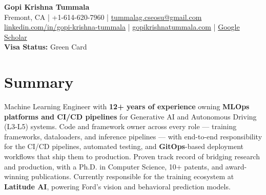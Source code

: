 \documentclass[10pt,letterpaper]{article}
\begin{document}
\begin{center}
    {\Huge \textbf{Gopi Krishna Tummala}} \\ [6pt]
    \large
    \faMapMarker* Fremont, CA \quad | \quad
    \faPhone* +1-614-620-7960 \quad | \quad
    \faEnvelope* \href{mailto:tummalag.cseosu@gmail.com}{tummalag.cseosu@gmail.com} \\ [4pt]
    \small
    \faLinkedin \href{https://www.linkedin.com/in/gopi-krishna-tummala-00294415/}{ linkedin.com/in/gopi-krishna-tummala} \quad | \quad
    \faGlobe \href{https://gopikrishnatummala.com/}{ gopikrishnatummala.com} \quad | \quad
    \faGraduationCap \href{https://scholar.google.com/citations?user=SaKqqO8AAAAJ&hl=en}{ Google Scholar} \\ [4pt]
    \textbf{Visa Status:} Green Card
\end{center}

\section{Summary}
Machine Learning Engineer with \textbf{12+ years of experience} owning \textbf{MLOps platforms and CI/CD pipelines} for Generative AI and Autonomous Driving (L3-L5) systems. Code and framework owner across every role — training frameworks, dataloaders, and inference pipelines — with end-to-end responsibility for the CI/CD pipelines, automated testing, and \textbf{GitOps}-based deployment workflows that ship them to production. Proven track record of bridging research and production, with a Ph.D. in Computer Science, 10+ patents, and award-winning publications. Currently responsible for the training ecosystem at \textbf{Latitude AI}, powering Ford's vision and behavioral prediction models.

\end{document}
